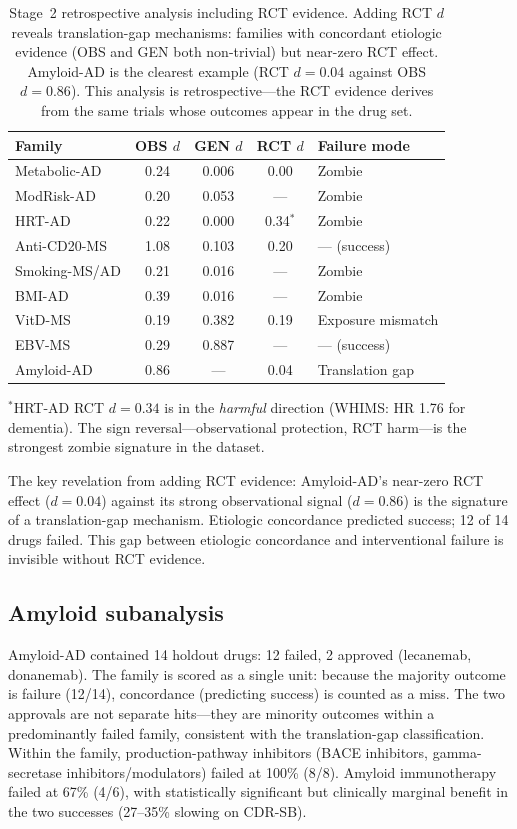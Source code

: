 \documentclass[11pt]{article}
\begin{document}
\begin{table}[t]
\centering
\caption{Stage~2 retrospective analysis including RCT evidence. Adding RCT $d$ reveals translation-gap mechanisms: families with concordant etiologic evidence (OBS and GEN both non-trivial) but near-zero RCT effect. Amyloid-AD is the clearest example (RCT $d = 0.04$ against OBS $d = 0.86$). This analysis is retrospective---the RCT evidence derives from the same trials whose outcomes appear in the drug set.}
\label{tab:stage2}
\begin{tabular}{lcccl}
\toprule
Family & OBS $d$ & GEN $d$ & RCT $d$ & Failure mode \\
\midrule
Metabolic-AD & 0.24 & 0.006 & 0.00 & Zombie \\
ModRisk-AD & 0.20 & 0.053 & --- & Zombie \\
HRT-AD & 0.22 & 0.000 & 0.34$^*$ & Zombie \\
Anti-CD20-MS & 1.08 & 0.103 & 0.20 & --- (success) \\
Smoking-MS/AD & 0.21 & 0.016 & --- & Zombie \\
BMI-AD & 0.39 & 0.016 & --- & Zombie \\
VitD-MS & 0.19 & 0.382 & 0.19 & Exposure mismatch \\
EBV-MS & 0.29 & 0.887 & --- & --- (success) \\
Amyloid-AD & 0.86 & --- & 0.04 & Translation gap \\
\bottomrule
\end{tabular}

\vspace{1mm}
{\footnotesize $^*$HRT-AD RCT $d = 0.34$ is in the \emph{harmful} direction (WHIMS: HR 1.76 for dementia). The sign reversal---observational protection, RCT harm---is the strongest zombie signature in the dataset.}
\end{table}

The key revelation from adding RCT evidence: Amyloid-AD's near-zero RCT effect ($d = 0.04$) against its strong observational signal ($d = 0.86$) is the signature of a translation-gap mechanism. Etiologic concordance predicted success; 12 of 14 drugs failed. This gap between etiologic concordance and interventional failure is invisible without RCT evidence.

\subsection{Amyloid subanalysis}

Amyloid-AD contained 14 holdout drugs: 12 failed, 2 approved (lecanemab, donanemab). The family is scored as a single unit: because the majority outcome is failure (12/14), concordance (predicting success) is counted as a miss. The two approvals are not separate hits---they are minority outcomes within a predominantly failed family, consistent with the translation-gap classification. Within the family, production-pathway inhibitors (BACE inhibitors, gamma-secretase inhibitors/modulators) failed at 100\% (8/8). Amyloid immunotherapy failed at 67\% (4/6), with statistically significant but clinically marginal benefit in the two successes (27--35\% slowing on CDR-SB).
\end{document}
